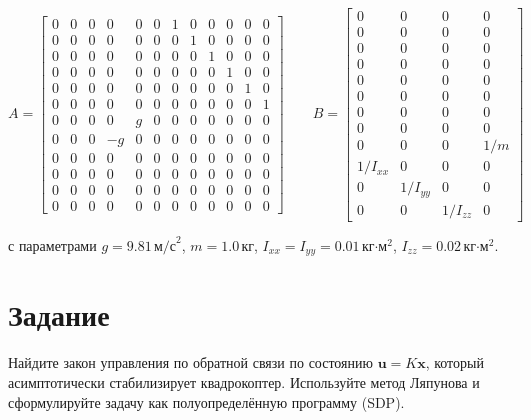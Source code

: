 \documentclass[8pt]{article}
\begin{document}
\[
A = 
\begin{bmatrix}
0 & 0 & 0 & 0 & 0 & 0 & 1 & 0 & 0 & 0 & 0 & 0 \\
0 & 0 & 0 & 0 & 0 & 0 & 0 & 1 & 0 & 0 & 0 & 0 \\
0 & 0 & 0 & 0 & 0 & 0 & 0 & 0 & 1 & 0 & 0 & 0 \\
0 & 0 & 0 & 0 & 0 & 0 & 0 & 0 & 0 & 1 & 0 & 0 \\
0 & 0 & 0 & 0 & 0 & 0 & 0 & 0 & 0 & 0 & 1 & 0 \\
0 & 0 & 0 & 0 & 0 & 0 & 0 & 0 & 0 & 0 & 0 & 1 \\
0 & 0 & 0 & 0 & g & 0 & 0 & 0 & 0 & 0 & 0 & 0 \\
0 & 0 & 0 & -g & 0 & 0 & 0 & 0 & 0 & 0 & 0 & 0 \\
0 & 0 & 0 & 0 & 0 & 0 & 0 & 0 & 0 & 0 & 0 & 0 \\
0 & 0 & 0 & 0 & 0 & 0 & 0 & 0 & 0 & 0 & 0 & 0 \\
0 & 0 & 0 & 0 & 0 & 0 & 0 & 0 & 0 & 0 & 0 & 0 \\
0 & 0 & 0 & 0 & 0 & 0 & 0 & 0 & 0 & 0 & 0 & 0
\end{bmatrix}
\qquad
B = 
\begin{bmatrix}
0 & 0 & 0 & 0 \\
0 & 0 & 0 & 0 \\
0 & 0 & 0 & 0 \\
0 & 0 & 0 & 0 \\
0 & 0 & 0 & 0 \\
0 & 0 & 0 & 0 \\
0 & 0 & 0 & 0 \\
0 & 0 & 0 & 0 \\
0 & 0 & 0 & 1/m \\
1/I_{xx} & 0 & 0 & 0 \\
0 & 1/I_{yy} & 0 & 0 \\
0 & 0 & 1/I_{zz} & 0
\end{bmatrix}
\]


с параметрами \(g = 9.81\,\text{м/с}^2\), \(m = 1.0\,\text{кг}\), \(I_{xx} = I_{yy} = 0.01\,\text{кг·м}^2\), \(I_{zz} = 0.02\,\text{кг·м}^2\).

\section*{Задание}

Найдите закон управления по обратной связи по состоянию \(\mathbf{u} = K\mathbf{x}\), который асимптотически стабилизирует квадрокоптер. Используйте метод Ляпунова и сформулируйте задачу как полуопределённую программу (SDP).
\end{document}
